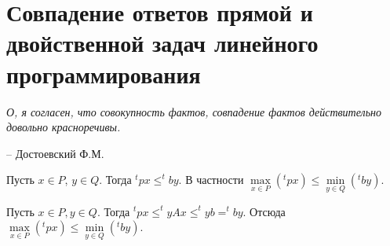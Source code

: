 \chapter{Совпадение ответов прямой и двойственной задач линейного программирования}
\label{cha:17}

\epigraph{
	\textit{О, я согласен, что совокупность фактов, совпадение фактов действительно довольно красноречивы.}}
{-- Достоевский Ф.М.}

\begin{propose}\label{cha:17/propose:1}
	Пусть $x \in P$, $y \in Q$. Тогда $^t px \le ^t by$. В частности $\underset{x \in P}{\max} (^t px) \le \underset{y \in Q}{\min} (^t by)$.
\end{propose}
\begin{Proof}
	Пусть $x \in P, y \in Q$. Тогда $^t px \le ^t y A x \le ^t y b = ^t b y$. Отсюда $\underset{x \in P}{\max} (^t px) \le \underset{y \in Q}{\min} (^t by)$.
\end{Proof}

